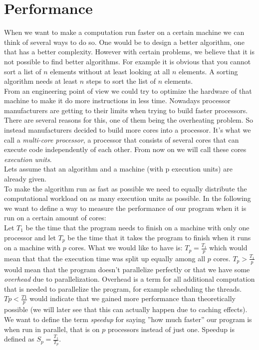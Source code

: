 \documentclass{scrreprt}
\begin{document}
\section{Performance}
When we want to make a computation run faster on a certain machine we can think of several ways to do so. One would be to design a better algorithm, one that has a better complexity. However with certain problems, we believe that it is not possible to find better algorithms. For example it is obvious that you cannot sort a list of $n$ elements without at least looking at all $n$ elements. A sorting algorithm needs at least $n$ steps to sort the list of $n$ elements. \\
From an engineering point of view we could try to optimize the hardware of that machine to make it do more instructions in less time. Nowadays processor manufacturers are getting to their limits when trying to build faster processors. There are several reasons for this, one of them being the overheating problem. So instead manufacturers decided to build more cores into a processor. It's what we call a \textit{multi-core processor}, a processor that consists of several cores that can execute code independently of each other. From now on we will call these cores \textit{execution units}. \\
Lets assume that an algorithm and a machine (with p execution units) are already given. \\
To make the algorithm run as fast as possible we need to equally distribute the computational workload on as many execution units as possible. In the following we want to define a way to measure the performance of our program when it is run on a certain amount of cores: \\
Let $T_1$ be the time that the program needs to finish on a machine with only one processor and let $T_p$ be the time that it takes the program to finish when it runs on a machine with $p$ cores. What we would like to have is: $T_p = \frac{T_1}{p}$ which would mean that that the execution time was split up equally among all $p$ cores. $T_p>\frac{T_1}{p}$ would mean that the program doesn't parallelize perfectly or that we have some \textit{overhead} due to parallelization. Overhead is a term for all additional computation that is needed to parallelize the program, for example scheduling the threads. $Tp<\frac{T1}{p}$ would indicate that we gained more performance than theoretically possible (we will later see that this can actually happen due to caching effects).\\
We want to define the term \textit{speedup} for saying ''how much faster'' our program is when run in parallel, that is on $p$ processors instead of just one. Speedup is defined as $S_p = \frac{T_1}{T_p}$. \\
\end{document}
